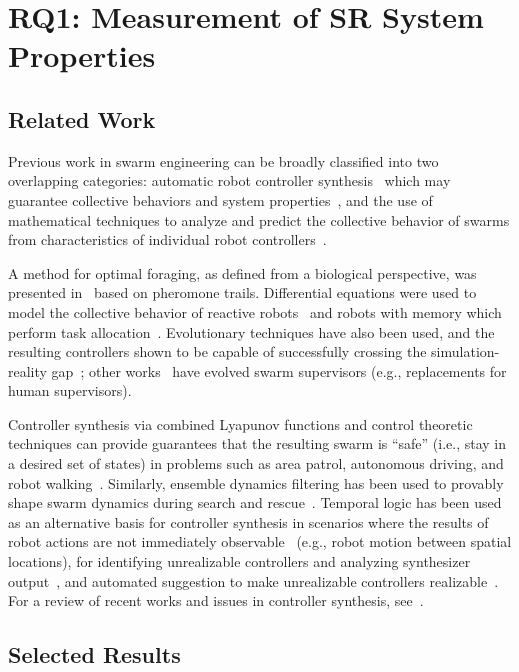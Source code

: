 \chapter{RQ1: Measurement of SR System Properties}%
\label{chap:RQ1}

\section{Related Work}\label{RQ1:sec:rw}
%
Previous work in swarm engineering can be broadly classified into two
overlapping categories: automatic robot controller
synthesis~\cite{Francesca2014} which may guarantee collective behaviors and
system
properties~\cite{Winfield2005,Campo2007,Turgut2008,Correll2008,Moarref2018},
and the use of mathematical techniques to analyze and predict the collective
behavior of swarms from characteristics of individual robot
controllers~\cite{Talamali2020,Lerman2006,Berman2007}.

A method for optimal foraging, as defined from a biological perspective, was
presented in~\cite{Talamali2020} based on pheromone trails. Differential
equations were used to model the collective behavior of reactive
robots~\cite{Lerman2001} and robots with memory which perform task
allocation~\cite{Lerman2006}. Evolutionary techniques have also been used, and
the resulting controllers shown to be capable of successfully crossing the
simulation-reality gap~\cite{Francesca2014,Ligot2020}; other
works~\cite{Hogg2020} have evolved swarm supervisors (e.g., replacements for
human supervisors).

Controller synthesis via combined Lyapunov functions and control theoretic
techniques can provide guarantees that the resulting swarm is ``safe'' (i.e.,
stay in a desired set of states) in problems such as area patrol, autonomous
driving, and robot
walking~\cite{Panagou2020,Glotfelter2019,Ames2021}. Similarly, ensemble dynamics
filtering has been used to provably shape swarm dynamics during search and
rescue~\cite{Hsieh2013}. Temporal logic has been used as an alternative basis
for controller synthesis in scenarios where the results of robot actions are not
immediately observable~\cite{Winfield2005,Moarref2018} (e.g., robot motion
between spatial locations), for identifying unrealizable controllers and
analyzing synthesizer output~\cite{Baumeister2020}, and automated suggestion to
make unrealizable controllers realizable~\cite{Pacheck2020}. For a review of
recent works and issues in controller synthesis, see~\cite{Birattari2019}.

\section{Selected Results}\label{RQ1:sec:selected-results}

